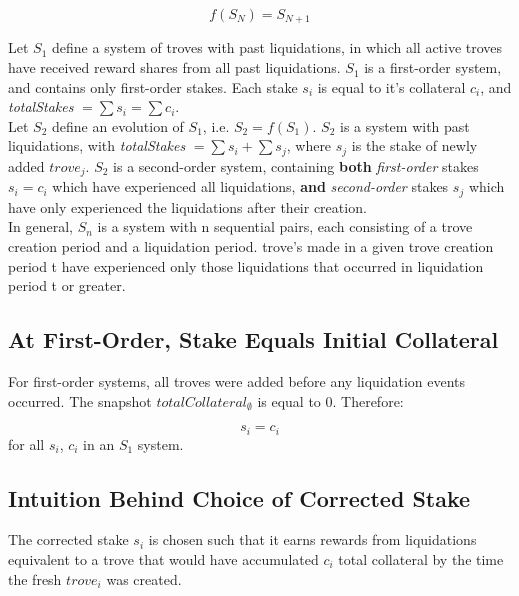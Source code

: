 \documentclass[reqno]{article}
\begin{document}
\begin{equation} 
    f(S_N)=S_{N+1}
\end{equation}

\bigskip
Let $S_1$ define a system of troves with past liquidations, in which all active troves have received reward shares from all past liquidations. $S_1$ is a first-order system, and contains only first-order stakes. Each stake $s_i$ is equal to it’s collateral $c_i$, and \textit{totalStakes} $= \sum s_i = \sum c_i$.\\

Let $S_2$ define an evolution of $S_1$, i.e. $S_2 = f(S_1)$. $S_2$ is a system with past liquidations, with \textit{totalStakes} $= \sum s_i + \sum s_j$, where $s_j$ is the stake of newly added $trove_j$. $S_2$ is a second-order system, containing \textbf{both} \textit{first-order} stakes $s_i = c_i$ which have experienced all liquidations, \textbf{and} \textit{second-order} stakes $s_j$ which have only experienced the liquidations after their creation.\\

In general, $S_n$ is a system with n sequential pairs, each consisting of a trove creation period and a liquidation period. trove's made in a given trove creation period t have experienced only those liquidations that occurred in liquidation period t or greater.


\subsection{At First-Order, Stake Equals Initial Collateral}

For first-order systems, all troves were added before any liquidation events occurred. The snapshot $totalCollateral_\emptyset$ is equal to 0. Therefore:

\begin{equation} 
    s_i=c_i
\end{equation}
for all $s_i$, $c_i$ in an $S_1$ system.

\subsection{Intuition Behind Choice of Corrected Stake}

The corrected stake $s_i$ is chosen such that it earns rewards from liquidations equivalent to a trove that would have accumulated $c_i$ total collateral by the time the fresh $trove_i$ was created.\\
\end{document}
